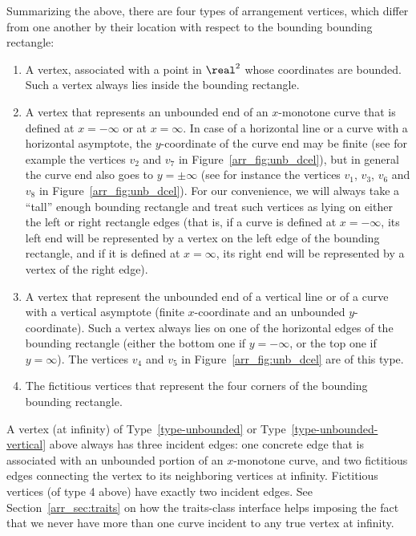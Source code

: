 \begin{ccAdvanced}
Summarizing the above, there are four types of arrangement vertices,
which differ from one another by their location with respect to the
bounding bounding rectangle:
\begin{enumerate}
\item\label{type-normal}
  A vertex, associated with a point in $\real^2$ whose
  coordinates are bounded. Such a vertex always lies inside the
  bounding rectangle.
\item\label{type-unbounded}
  A vertex that represents an unbounded end of an $x$-monotone curve
  that is defined at $x = -\infty$ or at $x = \infty$. In case of
  a horizontal line or a curve with a horizontal asymptote, the
  $y$-coordinate of the curve end may be finite (see for example the
  vertices $v_2$ and $v_7$ in Figure~\ref{arr_fig:unb_dcel}), but in
  general the curve end also goes to $y = \pm\infty$ (see for instance
  the vertices $v_1$, $v_3$, $v_6$ and $v_8$ in
  Figure~\ref{arr_fig:unb_dcel}). For our convenience, we will always
  take a ``tall'' enough bounding rectangle and treat such vertices as
  lying on either the left or right rectangle edges (that is, if a curve
  is defined at $x = -\infty$, its left end will be represented by
  a vertex on the left edge of the bounding rectangle, and if it is
  defined at $x = \infty$, its right end will be represented by a
  vertex of the right edge).
\item\label{type-unbounded-vertical}
  A vertex that represent the unbounded end of a vertical line or of a
  curve with a vertical asymptote (finite $x$-coordinate and an
  unbounded $y$-coordinate). Such a vertex always lies on one of the
  horizontal edges of the bounding rectangle (either the bottom one if
  $y = -\infty$, or the top one if $y = \infty$). The vertices $v_4$ 
  and $v_5$ in Figure~\ref{arr_fig:unb_dcel} are of this type.
\item\label{type-fictitious}
  The fictitious vertices that represent the four corners of the
  bounding bounding rectangle.
\end{enumerate}
A vertex (at infinity) of Type~\ref{type-unbounded} or
Type~\ref{type-unbounded-vertical} above always has
three incident edges: one concrete edge that is associated with an
unbounded portion of an $x$-monotone curve, and two fictitious edges
connecting the vertex to its neighboring vertices at infinity.
Fictitious vertices (of type 4 above) have exactly two incident edges.
See Section~\ref{arr_sec:traits} on how the traits-class interface
helps imposing the fact that we never have more than one curve
incident to any true vertex at infinity.


\end{ccAdvanced}
